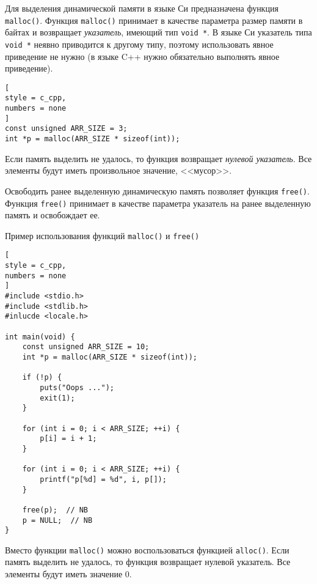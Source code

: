 \documentclass[%
	11pt,
	a4paper,
	utf8,
		]{article}
\begin{document}
Для выделения динамической памяти в языке Си предназначена функция \verb*|malloc()|. Функция \verb|malloc()| принимает в качестве параметра размер памяти в байтах и возвращает \emph{указатель}, имеющий тип \verb|void *|. В языке Си указатель типа \verb|void *| неявно приводится к другому типу, поэтому использовать явное приведение не нужно (в языке C++ нужно обязательно выполнять явное приведение).

\begin{lstlisting}[
style = c_cpp,
numbers = none
]
const unsigned ARR_SIZE = 3;
int *p = malloc(ARR_SIZE * sizeof(int));
\end{lstlisting}

Если память выделить не удалось, то функция возвращает \emph{нулевой указатель}. Все элементы будут иметь произвольное значение, <<мусор>>.

Освободить ранее выделенную динамическую память позволяет функция \verb*|free()|. Функция \verb|free()| принимает в качестве параметра указатель на ранее выделенную память и освобождает ее.

Пример использования функций \verb*|malloc()| и \verb*|free()|
\begin{lstlisting}[
style = c_cpp,
numbers = none
]
#include <stdio.h>
#include <stdlib.h>
#inlucde <locale.h>

int main(void) {
    const unsigned ARR_SIZE = 10;
    int *p = malloc(ARR_SIZE * sizeof(int));
    
    if (!p) {
        puts("Oops ...");
        exit(1);
    }
    
    for (int i = 0; i < ARR_SIZE; ++i) {
        p[i] = i + 1;
    }
    
    for (int i = 0; i < ARR_SIZE; ++i) {
        printf("p[%d] = %d", i, p[]);
    }
    
    free(p);  // NB
    p = NULL;  // NB
}
\end{lstlisting}

Вместо функции \verb*|malloc()| можно воспользоваться функцией \verb|alloc()|. Если память выделить не удалось, то функция возвращает нулевой указатель. Все элементы будут иметь значение 0.
\end{document}
